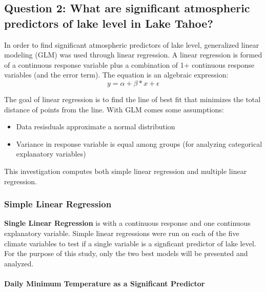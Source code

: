 \documentclass[12pt,]{article}
\providecommand{\tightlist}{%
  \setlength{\itemsep}{0pt}\setlength{\parskip}{0pt}}
\let\oldparagraph\paragraph
\renewcommand{\paragraph}[1]{\oldparagraph{#1}\mbox{}}
\begin{document}
\hypertarget{question-2-what-are-significant-atmospheric-predictors-of-lake-level-in-lake-tahoe}{%
\subsection{Question 2: What are significant atmospheric predictors of
lake level in Lake
Tahoe?}\label{question-2-what-are-significant-atmospheric-predictors-of-lake-level-in-lake-tahoe}}

In order to find significant atmospheric predictors of lake level,
generalized linear modeling (GLM) was used through linear regression. A
linear regression is formed of a continuous response variable plus a
combination of 1+ continuous response variables (and the error term).
The equation is an algebraic expression:
\[y = \alpha + \beta*x + \epsilon \]

The goal of linear regression is to find the line of best fit that
minimizes the total distance of points from the line. With GLM comes
some assumptions:

\begin{itemize}
\tightlist
\item
  Data resisduals approximate a normal distribution
\item
  Variance in response variable is equal among groups (for analyzing
  categorical explanatory variables)
\end{itemize}

This investigation computes both simple linear regression and multiple
linear regression.

\hypertarget{simple-linear-regression}{%
\subsubsection{Simple Linear
Regression}\label{simple-linear-regression}}

\textbf{Single Linear Regression} is with a continuous response and one
continuous explanatory variable. Simple linear regressions were run on
each of the five climate variables to test if a single variable is a
signficant predictor of lake level. For the purpose of this study, only
the two best models will be presented and analyzed.

\hypertarget{daily-minimum-temperature-as-a-significant-predictor}{%
\paragraph{Daily Minimum Temperature as a Significant
Predictor}\label{daily-minimum-temperature-as-a-significant-predictor}}
\end{document}
